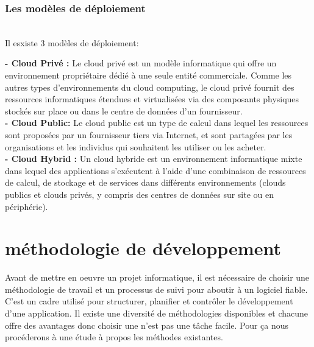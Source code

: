 \subsubsection{\Large Les modèles de déploiement }
\texttt{}\\[0.1cm]
\textsf{\selectfont{}Il esxiste 3 modèles de déploiement:}
\texttt{}\\[0.1cm]
\par \noindent \textbf{\LARGE - Cloud Privé :  }\textsf{\selectfont{} Le cloud privé est un modèle informatique qui offre un environnement propriétaire dédié à une seule entité commerciale. Comme les autres types d'environnements du cloud computing, le cloud privé fournit des ressources informatiques étendues et virtualisées via des composants physiques stockés sur place ou dans le centre de données d'un fournisseur.\cite{6}}\\[0.1cm]

\noindent \textbf{\LARGE - Cloud Public: }\textsf{\selectfont{} Le cloud public est un type de calcul dans lequel les ressources sont proposées par un fournisseur tiers via Internet, et sont partagées par les organisations et les individus qui souhaitent les utiliser ou les acheter.\cite{7}}\\[0.1cm]

\noindent \textbf{\LARGE - Cloud Hybrid :  }\textsf{\selectfont{} Un cloud hybride est un environnement informatique mixte dans lequel des applications s'exécutent à l'aide d'une combinaison de ressources de calcul, de stockage et de services dans différents environnements (clouds publics et clouds privés, y compris des centres de données sur site ou en périphérie).\cite{8}}\\[0.1cm]

\section {\Large méthodologie de développement }
\textsf{\selectfont{}
Avant de mettre en oeuvre un projet informatique, il est nécessaire de choisir une méthodologie de travail et un processus de suivi pour aboutir à un logiciel fiable.
C’est un cadre utilisé pour structurer, planifier et contrôler le développement d’une application.
Il existe une diversité de méthodologies disponibles et
chacune offre des avantages donc choisir une n’est pas une tâche facile.
Pour ça nous procéderons à une étude à propos les méthodes existantes.}\\[0.2cm]
